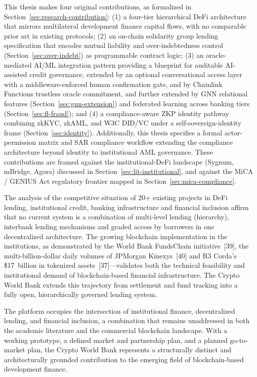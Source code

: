 \documentclass[12pt,a4paper]{report}
\begin{document}
This thesis makes four original contributions, as formalized in Section~\ref{sec:research-contribution}: (1) a four-tier hierarchical DeFi architecture that mirrors multilateral development finance capital flows, with no comparable prior art in existing protocols; (2) an on-chain solidarity group lending specification that encodes mutual liability and over-indebtedness control (Section~\ref{sec:over-indebt}) as programmable contract logic; (3) an oracle-mediated AI/ML integration pattern providing a blueprint for auditable AI-assisted credit governance, extended by an optional conversational access layer with a middleware-enforced human confirmation gate, and by Chainlink Functions trustless oracle commitment, and further extended by GNN relational features (Section~\ref{sec:gnn-extension}) and federated learning across banking tiers (Section~\ref{sec:fl-fraud}); and (4) a compliance-aware ZKP identity pathway combining zkKYC, zkAML, and W3C DID/VC under a self-sovereign-identity frame (Section~\ref{sec:identity}). Additionally, this thesis specifies a formal actor-permission matrix and SAR compliance workflow extending the compliance architecture beyond identity to institutional AML governance. These contributions are framed against the institutional-DeFi landscape (Sygnum, mBridge, Agora) discussed in Section~\ref{sec:lit-institutional}, and against the MiCA / GENIUS Act regulatory frontier mapped in Section~\ref{sec:mica-compliance}.

The analysis of the competitive situation of 20+ existing projects in DeFi lending, institutional credit, banking infrastructure and financial inclusion affirm that no current system is a combination of multi-level lending (hierarchy), interbank lending mechanisms and graded access by borrowers in one decentralized architecture. The growing blockchain implementation in the institutions, as demonstrated by the World Bank FundsChain initiative~[39], the multi-billion-dollar daily volumes of JPMorgan Kinexys~[40] and R3 Corda's \$17~billion in tokenized assets~[37]---validates both the technical feasibility and institutional demand of blockchain-based financial infrastructure. The Crypto World Bank extends this trajectory from settlement and fund tracking into a fully open, hierarchically governed lending system.

The platform occupies the intersection of institutional finance, decentralized lending, and financial inclusion, a combination that remains unaddressed in both the academic literature and the commercial blockchain landscape. With a working prototype, a defined market and partnership plan, and a planned go-to-market plan, the Crypto World Bank represents a structurally distinct and architecturally grounded contribution to the emerging field of blockchain-based development finance.
\end{document}
